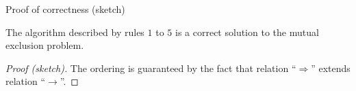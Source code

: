 \documentclass[12pt]{beamer}
\begin{document}
    \begin{frame}{Proof of correctness (sketch)}
        \begin{theorem}
            The algorithm described by rules \(1\) to \(5\) is a correct solution to the
            mutual exclusion problem.
        \end{theorem}
        \begin{proof}[Proof (sketch)]
            The ordering is guaranteed by the fact that relation ``\(\Rightarrow\)''
            extends relation ``\(\rightarrow\)''.
        \end{proof}
    \end{frame}
\end{document}
